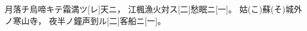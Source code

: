 \documentclass{article}
\begin{document}
\Kanbun
月落チ烏啼キテ霜満ツ[レ]天ニ，
江楓漁火対ス[二]愁眠ニ[一]。
姑(こ)蘇(そ)城外ノ寒山寺，
夜半ノ鐘声到ル[二]客船ニ[一]。
\EndKanbun
\printkanbun
\end{document}
